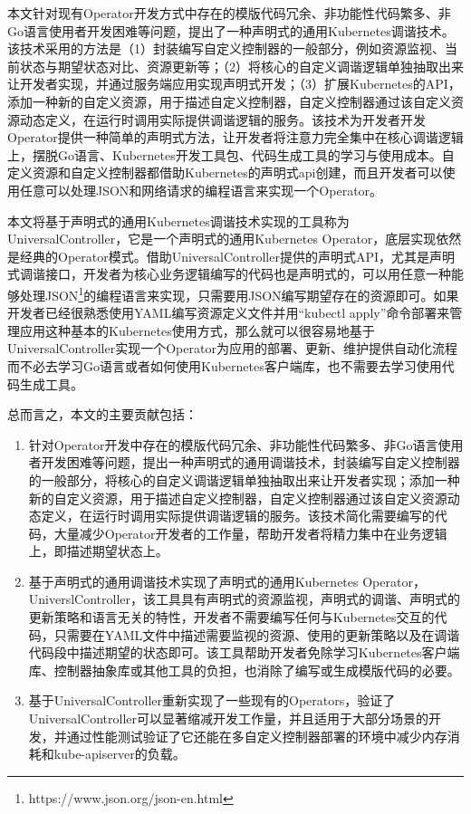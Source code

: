 \documentclass[macfonts,master]{njuthesis}
\begin{document}
本文针对现有Operator开发方式中存在的模版代码冗余、非功能性代码繁多、非Go语言使用者开发困难等问题，提出了一种声明式的通用Kubernetes调谐技术。该技术采用的方法是（1）封装编写自定义控制器的一般部分，例如资源监视、当前状态与期望状态对比、资源更新等；（2）将核心的自定义调谐逻辑单独抽取出来让开发者实现，并通过服务端应用实现声明式开发；（3）扩展Kubernetes的API，添加一种新的自定义资源，用于描述自定义控制器，自定义控制器通过该自定义资源动态定义，在运行时调用实际提供调谐逻辑的服务。该技术为开发者开发Operator提供一种简单的声明式方法，让开发者将注意力完全集中在核心调谐逻辑上，摆脱Go语言、Kubernetes开发工具包、代码生成工具的学习与使用成本。自定义资源和自定义控制器都借助Kubernetes的声明式api创建，而且开发者可以使用任意可以处理JSON和网络请求的编程语言来实现一个Operator。

本文将基于声明式的通用Kubernetes调谐技术实现的工具称为UniversalController，它是一个声明式的通用Kubernetes Operator，底层实现依然是经典的Operator模式。借助UniversalController提供的声明式API，尤其是声明式调谐接口，开发者为核心业务逻辑编写的代码也是声明式的，可以用任意一种能够处理JSON\footnote{https://www.json.org/json-en.html}的编程语言来实现，只需要用JSON编写期望存在的资源即可。如果开发者已经很熟悉使用YAML编写资源定义文件并用``kubectl apply''命令部署来管理应用这种基本的Kubernetes使用方式，那么就可以很容易地基于UniversalController实现一个Operator为应用的部署、更新、维护提供自动化流程而不必去学习Go语言或者如何使用Kubernetes客户端库，也不需要去学习使用代码生成工具。

总而言之，本文的主要贡献包括：

\begin{enumerate}
	\item 针对Operator开发中存在的模版代码冗余、非功能性代码繁多、非Go语言使用者开发困难等问题，提出一种声明式的通用调谐技术，封装编写自定义控制器的一般部分，将核心的自定义调谐逻辑单独抽取出来让开发者实现；添加一种新的自定义资源，用于描述自定义控制器，自定义控制器通过该自定义资源动态定义，在运行时调用实际提供调谐逻辑的服务。该技术简化需要编写的代码，大量减少Operator开发者的工作量，帮助开发者将精力集中在业务逻辑上，即描述期望状态上。
	\item 基于声明式的通用调谐技术实现了声明式的通用Kubernetes Operator，UniverslController，该工具具有声明式的资源监视，声明式的调谐、声明式的更新策略和语言无关的特性，开发者不需要编写任何与Kubernetes交互的代码，只需要在YAML文件中描述需要监视的资源、使用的更新策略以及在调谐代码段中描述期望的状态即可。该工具帮助开发者免除学习Kubernetes客户端库、控制器抽象库或其他工具的负担，也消除了编写或生成模版代码的必要。
	\item 基于UniversalController重新实现了一些现有的Operators，验证了UniversalController可以显著缩减开发工作量，并且适用于大部分场景的开发，并通过性能测试验证了它还能在多自定义控制器部署的环境中减少内存消耗和kube-apiserver的负载。
\end{enumerate}
\end{document}

